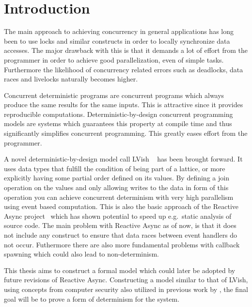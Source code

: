 \chapter{Introduction}
\label{cha:introduction}

The main approach to achieving concurrency in general applications has long been
to use locks and similar constructs in order to locally synchronize data
accesses. The major drawback with this is that it demands a lot of effort from
the programmer in order to achieve good parallelization, even of simple tasks.
Furthermore the likelihood of concurrency related errors such as deadlocks, data
races and livelocks naturally becomes higher. 

Concurrent deterministic programs are concurrent programs which always produce
the same results for the same inputs. This is attractive since it provides
reproducible computations.  Deterministic-by-design concurrent programming
models are systems which guarantees this property at compile time and thus
significantly simplifies concurrent programming. This greatly eases effort
from the programmer. 

A novel deterministic-by-design model call LVish ~\parencite{kuper2013lvars,
kuper2014freeze} has been brought forward.  It uses data types that fulfill the
condition of being part of a lattice, or more explicitly having some partial
order defined on its values. By defining a join operation on the values and only
allowing writes to the data in form of this operation you can achieve concurrent
determinism with very high parallelism using event based computation.  This is
also the basic approach of the Reactive Async
project~\parencite{conf/scala/HallerGES16} which has shown potential to speed up
e.g.\ static analysis of source code. The main problem with Reactive Async as
of now, is that it does not include any construct to ensure that data races
between event handlers do not occur. Futhermore there are also more fundamental
problems with callback spawning which could also lead to non-determinism.

This thesis aims to construct a formal model which could later be adopted by
future revisions of Reactive Async. Constructing a model similar to that
of LVish, using concepts from computer security also
utilized in previous work by \textcite{conf/oopsla/HallerL16}, the final goal
will be to prove a form of determinism for the system.
